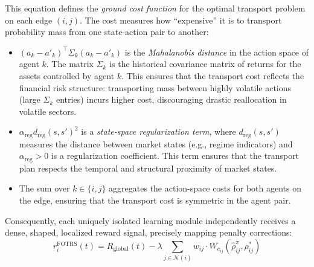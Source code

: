 \documentclass[12pt,a4paper,oneside]{report}
\theoremstyle{definition}
\theoremstyle{remark}
\begin{document}
\medskip
\noindent This equation defines the \emph{ground cost function} for the optimal transport problem on each edge $(i,j)$. The cost measures how ``expensive'' it is to transport probability mass from one state-action pair to another:
\begin{itemize}[leftmargin=2em]
  \item $(a_k - a'_k)^\top \Sigma_k (a_k - a'_k)$ is the \emph{Mahalanobis distance} in the action space of agent $k$. The matrix $\Sigma_k$ is the historical covariance matrix of returns for the assets controlled by agent $k$. This ensures that the transport cost reflects the financial risk structure: transporting mass between highly volatile actions (large $\Sigma_k$ entries) incurs higher cost, discouraging drastic reallocation in volatile sectors.
  \item $\alpha_{\text{reg}} d_{\text{reg}}(s, s')^2$ is a \emph{state-space regularization term}, where $d_{\text{reg}}(s, s')$ measures the distance between market states (e.g., regime indicators) and $\alpha_{\text{reg}} > 0$ is a regularization coefficient. This term ensures that the transport plan respects the temporal and structural proximity of market states.
  \item The sum over $k \in \{i,j\}$ aggregates the action-space costs for both agents on the edge, ensuring that the transport cost is symmetric in the agent pair.
\end{itemize}

\medskip
\noindent Consequently, each uniquely isolated learning module independently receives a dense, shaped, localized reward signal, precisely mapping penalty corrections:
\begin{equation} \label{eq:fotrs_reward}
r_i^{\text{FOTRS}}(t) = R_{\text{global}}(t) - \lambda \sum_{j \in \mathcal{N}(i)} w_{ij} \cdot W_{c_{ij}}(\hat{\rho}^\pi_{ij}, \rho^*_{ij})
\end{equation}
\end{document}

